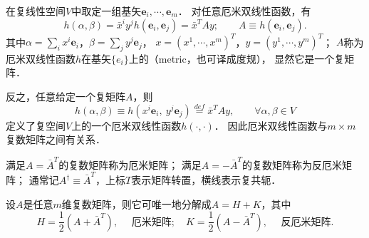 
在复线性空间$V$中取定一组基矢$\boldsymbol{e}_i,\cdots,\boldsymbol{e}_m$．
对任意厄米双线性函数，有
\begin{equation}
    h(\alpha,\beta)=\bar{x}^i y^j h(\boldsymbol{e}_i,\boldsymbol{e}_j)
     = \bar{x}^T A y;\qquad A \equiv  h(\boldsymbol{e}_i,\boldsymbol{e}_j). 
\end{equation}
其中$\alpha=\sum_i x^i \boldsymbol{e}_i$，$\beta=\sum_j y^j \boldsymbol{e}_j$，
$x=(x^1,\cdots,x^m)^T$，$y=(y^1,\cdots,y^m)^T$；
$A$称为厄米双线性函数$h$在基矢$\{e_i\}$上的（metric，也可译成{\kaishu 度规}），
显然它是一个复矩阵．

反之，任意给定一个复矩阵$A$，则
\begin{equation}
    h(\alpha,\beta)\equiv h\left(x^i \boldsymbol{e}_i,\ y^j \boldsymbol{e}_j \right)
    \overset{def}{=} \bar{x}^T A y, \qquad \forall \alpha,\beta\in V
\end{equation}
定义了复空间$V$上的一个厄米双线性函数$h(\cdot,\cdot)$．
因此厄米双线性函数与$m\times m$复数矩阵之间有关系．



\begin{definition}
    满足$A  = \bar{A}^T$的复数矩阵称为{\heiti 厄米矩阵}；
    满足$A = -\bar{A}^T$的复数矩阵称为{\heiti 反厄米矩阵}；
    通常记$A^\dagger \equiv \bar{A}^T$，上标$T$表示矩阵转置，横线表示复共轭．
\end{definition}


\begin{example}
    设$A$是任意$m$维复数矩阵，则它可唯一地分解成$A= H+K$，其中
    \begin{equation}
        H=\frac{1}{2}(A + \bar{A}^T),\quad \text{ 厄米矩阵};\quad
        K=\frac{1}{2}(A - \bar{A}^T),\quad \text{ 反厄米矩阵}.
    \end{equation}
\end{example}

